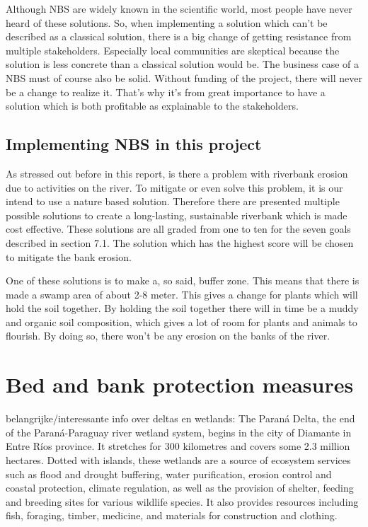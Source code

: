 Although NBS are widely known in the scientific world, most people have never heard of these solutions. So, when implementing a solution which can't be described as a classical solution, there is a big change of getting resistance from multiple stakeholders. Especially local communities are skeptical because the solution is less concrete than a classical solution would be. The business case of a NBS must of course also be solid. Without funding of the project, there will never be a change to realize it. That's why it's from great importance to have a solution which is both profitable as explainable to the stakeholders. 

\subsection{Implementing NBS in this project}

As stressed out before in this report, is there a problem with riverbank erosion due to activities on the river. To mitigate or even solve this problem, it is our intend to use a nature based solution. Therefore there are presented multiple possible solutions to create a long-lasting, sustainable riverbank which is made cost effective. These solutions are all graded from one to ten for the seven goals described in section 7.1. The solution which has the highest score will be chosen to mitigate the bank erosion.

One of these solutions is to make a, so said, buffer zone. This means that there is made a swamp area of about 2-8 meter. This gives a change for plants which will hold the soil together. By holding the soil together there will in time be a muddy and organic soil composition, which gives a lot of room for plants and animals to flourish. By doing so, there won't be any erosion on the banks of the river. 


\section{Bed and bank protection measures}

belangrijke/interessante info over deltas en wetlands:
The Paraná Delta, the end of the Paraná-Paraguay river wetland system, begins in the city of Diamante in Entre Ríos province. It stretches for 300 kilometres and covers some 2.3 million hectares. Dotted with islands, these wetlands are a source of ecosystem services such as flood and drought buffering, water purification, erosion control and coastal protection, climate regulation, as well as the provision of shelter, feeding and breeding sites for various wildlife species. It also provides resources including fish, foraging, timber, medicine, and materials for construction and clothing.


